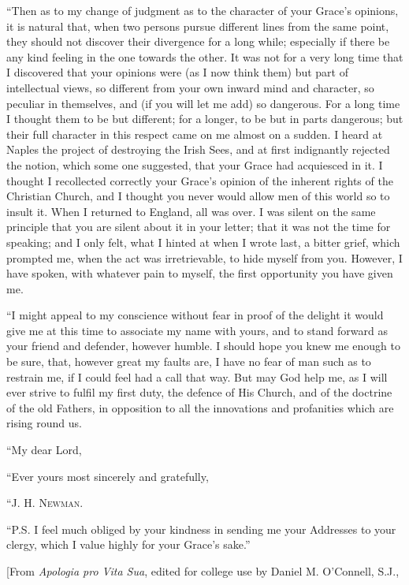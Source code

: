 ``Then as to my change of judgment as to the
character of your Grace's opinions, it is natural that, when two persons
pursue different lines from the same point, they should not discover
their divergence for a long while; especially if there be any kind
feeling in the one towards the other. It was not for a very long time
that I discovered that your opinions were (as I now think them) but part
of intellectual views, so different from your own inward mind and
character, so peculiar in themselves, and (if you will let me add) so
dangerous. For a long time I thought them to be but different; for a
longer, to be but in parts dangerous; but their full character in this
respect came on me almost on a sudden. I heard at Naples the project of
destroying the Irish Sees, and at first indignantly rejected the notion,
which some one suggested, that your Grace had acquiesced in it. I
thought I recollected correctly your Grace's opinion of the inherent
rights of the Christian Church, and I thought you never would allow men
of this world so to insult it. When I returned to England, all was over.
I was silent on the same principle that you are silent about it in your
letter; that it was not the time for speaking; and I only felt, what I
hinted at when I wrote last, a bitter grief, which prompted me, when the
act was irretrievable, to hide myself from you. However, I have spoken,
with whatever pain to myself, the first opportunity you have given me.

``I might appeal to my conscience without fear in
proof of the delight it would give me at this time to associate my name
with yours, and to stand forward as your friend and defender, however
humble. I should hope you knew me enough to be sure, that, however great
my faults are, I have no fear of man such as to restrain me, if I could
feel had a call that way. But may God help me, as I will ever strive to
fulfil my first duty, the defence of His Church, and of the
doctrine of the old Fathers, in opposition to all the innovations and
profanities which are rising round us.

``My dear Lord,

``Ever yours most sincerely and gratefully,

``J. H. N\textsc{ewman}.

``P.S. I feel much obliged by your kindness in
sending me your Addresses to your clergy, which I value highly for your
Grace's sake.''


[From \emph{Apologia pro Vita Sua}, edited for college
use by Daniel M. O'Connell, S.J.,

